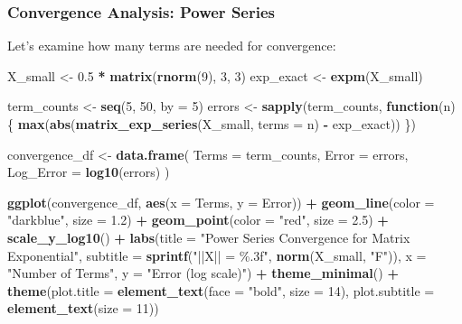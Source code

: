 \documentclass[
]{book}
\newenvironment{Shaded}{\begin{snugshade}}{\end{snugshade}}
\newcommand{\AttributeTok}[1]{\textcolor[rgb]{0.13,0.29,0.53}{#1}}
\newcommand{\ControlFlowTok}[1]{\textcolor[rgb]{0.13,0.29,0.53}{\textbf{#1}}}
\newcommand{\DecValTok}[1]{\textcolor[rgb]{0.00,0.00,0.81}{#1}}
\newcommand{\FloatTok}[1]{\textcolor[rgb]{0.00,0.00,0.81}{#1}}
\newcommand{\FunctionTok}[1]{\textcolor[rgb]{0.13,0.29,0.53}{\textbf{#1}}}
\newcommand{\NormalTok}[1]{#1}
\newcommand{\OtherTok}[1]{\textcolor[rgb]{0.56,0.35,0.01}{#1}}
\newcommand{\SpecialCharTok}[1]{\textcolor[rgb]{0.81,0.36,0.00}{\textbf{#1}}}
\newcommand{\StringTok}[1]{\textcolor[rgb]{0.31,0.60,0.02}{#1}}
\theoremstyle{definition}
\theoremstyle{definition}
\theoremstyle{definition}
\theoremstyle{definition}
\theoremstyle{remark}
\begin{document}
\subsubsection{Convergence Analysis: Power Series}\label{convergence-analysis-power-series}

Let's examine how many terms are needed for convergence:

\begin{Shaded}
\begin{Highlighting}[]
\NormalTok{X\_small }\OtherTok{\textless{}{-}} \FloatTok{0.5} \SpecialCharTok{*} \FunctionTok{matrix}\NormalTok{(}\FunctionTok{rnorm}\NormalTok{(}\DecValTok{9}\NormalTok{), }\DecValTok{3}\NormalTok{, }\DecValTok{3}\NormalTok{)}
\NormalTok{exp\_exact }\OtherTok{\textless{}{-}} \FunctionTok{expm}\NormalTok{(X\_small)}

\NormalTok{term\_counts }\OtherTok{\textless{}{-}} \FunctionTok{seq}\NormalTok{(}\DecValTok{5}\NormalTok{, }\DecValTok{50}\NormalTok{, }\AttributeTok{by =} \DecValTok{5}\NormalTok{)}
\NormalTok{errors }\OtherTok{\textless{}{-}} \FunctionTok{sapply}\NormalTok{(term\_counts, }\ControlFlowTok{function}\NormalTok{(n) \{}
  \FunctionTok{max}\NormalTok{(}\FunctionTok{abs}\NormalTok{(}\FunctionTok{matrix\_exp\_series}\NormalTok{(X\_small, }\AttributeTok{terms =}\NormalTok{ n) }\SpecialCharTok{{-}}\NormalTok{ exp\_exact))}
\NormalTok{\})}

\NormalTok{convergence\_df }\OtherTok{\textless{}{-}} \FunctionTok{data.frame}\NormalTok{(}
  \AttributeTok{Terms =}\NormalTok{ term\_counts,}
  \AttributeTok{Error =}\NormalTok{ errors,}
  \AttributeTok{Log\_Error =} \FunctionTok{log10}\NormalTok{(errors)}
\NormalTok{)}

\FunctionTok{ggplot}\NormalTok{(convergence\_df, }\FunctionTok{aes}\NormalTok{(}\AttributeTok{x =}\NormalTok{ Terms, }\AttributeTok{y =}\NormalTok{ Error)) }\SpecialCharTok{+}
  \FunctionTok{geom\_line}\NormalTok{(}\AttributeTok{color =} \StringTok{"darkblue"}\NormalTok{, }\AttributeTok{size =} \FloatTok{1.2}\NormalTok{) }\SpecialCharTok{+}
  \FunctionTok{geom\_point}\NormalTok{(}\AttributeTok{color =} \StringTok{"red"}\NormalTok{, }\AttributeTok{size =} \FloatTok{2.5}\NormalTok{) }\SpecialCharTok{+}
  \FunctionTok{scale\_y\_log10}\NormalTok{() }\SpecialCharTok{+}
  \FunctionTok{labs}\NormalTok{(}\AttributeTok{title =} \StringTok{"Power Series Convergence for Matrix Exponential"}\NormalTok{,}
       \AttributeTok{subtitle =} \FunctionTok{sprintf}\NormalTok{(}\StringTok{"||X|| = \%.3f"}\NormalTok{, }\FunctionTok{norm}\NormalTok{(X\_small, }\StringTok{"F"}\NormalTok{)),}
       \AttributeTok{x =} \StringTok{"Number of Terms"}\NormalTok{,}
       \AttributeTok{y =} \StringTok{"Error (log scale)"}\NormalTok{) }\SpecialCharTok{+}
  \FunctionTok{theme\_minimal}\NormalTok{() }\SpecialCharTok{+}
  \FunctionTok{theme}\NormalTok{(}\AttributeTok{plot.title =} \FunctionTok{element\_text}\NormalTok{(}\AttributeTok{face =} \StringTok{"bold"}\NormalTok{, }\AttributeTok{size =} \DecValTok{14}\NormalTok{),}
        \AttributeTok{plot.subtitle =} \FunctionTok{element\_text}\NormalTok{(}\AttributeTok{size =} \DecValTok{11}\NormalTok{))}
\end{Highlighting}
\end{Shaded}
\end{document}
